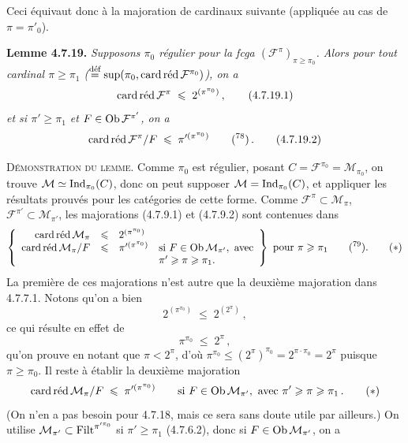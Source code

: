 Ceci équivaut donc à la majoration de cardinaux suivante (appliquée au cas de $\pi=\pi'_0$).

\textbf{Lemme 4.7.19.} \textit{Supposons $\pi_0$ régulier pour la fcga $(\mathcal{F}^{\pi})_{\pi\geqslant\pi_0}$. Alors pour tout cardinal $\pi\geqslant\pi_1$ ($\overset{\text{déf}}{=}\sup(\pi_0,\cardred\mathcal{F}^{\pi_0})$), on a}
\[
\cardred\mathcal{F}^{\pi} \;\leqslant\; 2^{(\pi^{\pi_0})} \, , \tag*{(4.7.19.1)}
\]
\textit{et si $\pi'\geqslant\pi_1$ et $F\in\Ob\mathcal{F}^{\pi'}$, on a}
\[
\cardred\mathcal{F}^{\pi}/F \;\leqslant\; \pi'^{(\pi^{\pi_0})} \qquad \text{(\footnotemark[78])} \, . \tag*{(4.7.19.2)}
\]

\noindent{}\textsc{Démonstration du lemme}. Comme $\pi_0$ est régulier, posant $C=\mathcal{F}^{\pi_0}=\mathcal{M}_{\pi_0}$, on trouve $\mathcal{M}\simeq\Ind_{\pi_0}(C)$, donc on peut supposer $\mathcal{M}=\Ind_{\pi_0}(C)$, et appliquer les résultats prouvés pour les catégories de cette forme. Comme $\mathcal{F}^{\pi}\subset\mathcal{M}_\pi$, $\mathcal{F}^{\pi'}\subset\mathcal{M}_{\pi'}$, les majorations (4.7.9.1) et (4.7.9.2) sont contenues dans %
\[
\left\{
\begin{array}{rcll}
\cardred\mathcal{M}_\pi & \leqslant & 2^{(\pi^{\pi_0})} & \\
\cardred\mathcal{M}_\pi/F & \leqslant & \pi'^{(\pi^{\pi_0})} & \text{si } F\in\Ob\mathcal{M}_{\pi'},\ \text{avec}\\
 & & & \pi'\geqslant\pi\geqslant\pi_1.
\end{array}
\right\}
\ \text{pour } \pi\geqslant\pi_1 \qquad \text{(\footnotemark[79])}. \tag*{$(*)$}
\]
La première de ces majorations n'est autre que la deuxième majoration dans 4.7.7.1. Notons qu'on a bien
\[
2^{(\pi^{\pi_0})} \;\leqslant\; 2^{(2^{\pi})} \, ,
\]
ce qui résulte en effet de
\[
\pi^{\pi_0} \;\leqslant\; 2^{\pi} \, ,
\]
qu'on prouve en notant que $\pi<2^{\pi}$, d'où $\pi^{\pi_0}\leqslant(2^{\pi})^{\pi_0}=2^{\pi\cdot\pi_0}=2^{\pi}$ puisque $\pi\geqslant\pi_0$. Il reste à établir la deuxième majoration
\[
\cardred\mathcal{M}_\pi/F \;\leqslant\; \pi'^{(\pi^{\pi_0})} \qquad \text{si } F\in\Ob\mathcal{M}_{\pi'},\ \text{avec } \pi'\geqslant\pi\geqslant\pi_1 \, . \tag*{$(*)$}
\]
(On n'en a pas besoin pour 4.7.18, mais ce sera sans doute utile par ailleurs.) On utilise $\mathcal{M}_{\pi'}\subset\Filt^{\pi'^{\pi_0}}$ si $\pi'\geqslant\pi_1$ (4.7.6.2), donc si $F\in\Ob\mathcal{M}_{\pi'}$, on a

